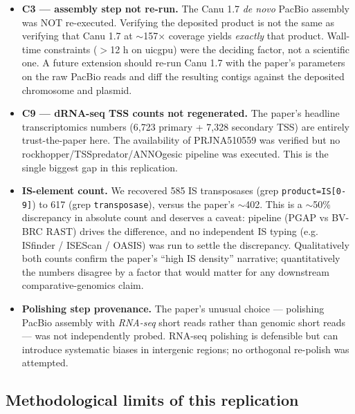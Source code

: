 \documentclass[11pt]{article}
\begin{document}
\begin{itemize}[nosep]
  \item \textbf{C3 --- assembly step not re-run.} The Canu 1.7 \textit{de novo} PacBio assembly
    was NOT re-executed. Verifying the deposited product is not the same as verifying that Canu
    1.7 at $\sim$157$\times$ coverage yields \textit{exactly} that product. Wall-time constraints
    ($>$12 h on uicgpu) were the deciding factor, not a scientific one. A future extension should
    re-run Canu 1.7 with the paper's parameters on the raw PacBio reads and diff the resulting
    contigs against the deposited chromosome and plasmid.
  \item \textbf{C9 --- dRNA-seq TSS counts not regenerated.} The paper's headline transcriptomics
    numbers (6{,}723 primary + 7{,}328 secondary TSS) are entirely trust-the-paper here. The
    availability of PRJNA510559 was verified but no rockhopper/TSSpredator/ANNOgesic pipeline was
    executed. This is the single biggest gap in this replication.
  \item \textbf{IS-element count.} We recovered 585 IS transposases (grep \texttt{product=IS[0-9]})
    to 617 (grep \texttt{transposase}), versus the paper's $\sim$402. This is a $\sim$50\%
    discrepancy in absolute count and deserves a caveat: pipeline (PGAP vs BV-BRC RAST) drives
    the difference, and no independent IS typing (e.g. ISfinder / ISEScan / OASIS) was run to
    settle the discrepancy. Qualitatively both counts confirm the paper's ``high IS density''
    narrative; quantitatively the numbers disagree by a factor that would matter for any
    downstream comparative-genomics claim.
  \item \textbf{Polishing step provenance.} The paper's unusual choice --- polishing PacBio
    assembly with \textit{RNA-seq} short reads rather than genomic short reads --- was not
    independently probed. RNA-seq polishing is defensible but can introduce systematic biases in
    intergenic regions; no orthogonal re-polish was attempted.
\end{itemize}

\subsection{Methodological limits of this replication}
\end{document}
